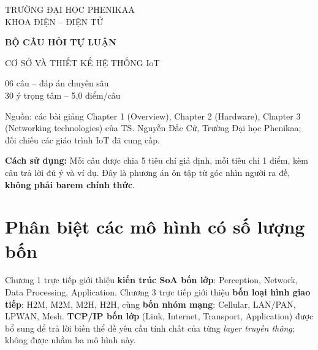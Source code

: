\documentclass[12pt,a4paper]{article}
\begin{document}
\begin{titlepage}\centering\vspace*{30mm}
{\Large TRƯỜNG ĐẠI HỌC PHENIKAA\\KHOA ĐIỆN -- ĐIỆN TỬ\par}
\vspace{18mm}
{\Huge\bfseries\color{navy}BỘ CÂU HỎI TỰ LUẬN\par}
\vspace{8mm}
{\LARGE CƠ SỞ VÀ THIẾT KẾ HỆ THỐNG IoT\par}
\vspace{12mm}
{\Large 06 câu -- đáp án chuyên sâu\\30 ý trọng tâm -- 5,0 điểm/câu\par}
\vfill
\begin{minipage}{.84\linewidth}
Nguồn: các bài giảng Chapter 1 (Overview), Chapter 2 (Hardware), Chapter 3 (Networking technologies) của TS. Nguyễn Đắc Cử, Trường Đại học Phenikaa; đối chiếu các giáo trình IoT đã cung cấp.

\medskip
\textbf{Cách sử dụng:} Mỗi câu được chia 5 tiêu chí giả định, mỗi tiêu chí 1 điểm, kèm câu trả lời đủ ý và ví dụ. Đây là phương án ôn tập từ góc nhìn người ra đề, \textbf{không phải barem chính thức}.
\end{minipage}
\vspace{15mm}{\large 10/2026}
\end{titlepage}
\tableofcontents\newpage
\section*{Phân biệt các mô hình có số lượng bốn}
Chương 1 trực tiếp giới thiệu \textbf{kiến trúc SoA bốn lớp}: Perception, Network, Data Processing, Application. Chương 3 trực tiếp giới thiệu \textbf{bốn loại hình giao tiếp}: H2M, M2M, M2H, H2H, cùng \textbf{bốn nhóm mạng}: Cellular, LAN/PAN, LPWAN, Mesh. \textbf{TCP/IP bốn lớp} (Link, Internet, Transport, Application) được bổ sung để trả lời biến thể đề yêu cầu tính chất của từng \emph{layer truyền thông}; không được nhầm ba mô hình này.
\newpage
\end{document}
